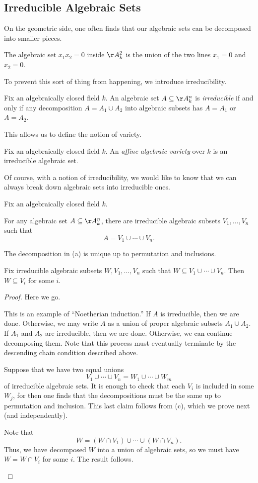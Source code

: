 \documentclass[../notes.tex]{subfiles}
\begin{document}
\subsection{Irreducible Algebraic Sets}
On the geometric side, one often finds that our algebraic sets can be decomposed into smaller pieces.
\begin{example}
	The algebraic set $x_1x_2=0$ inside $\AA^2_k$ is the union of the two lines $x_1=0$ and $x_2=0$.
\end{example}
To prevent this sort of thing from happening, we introduce irreducibility.
\begin{definition}[irreducible]
	Fix an algebraically closed field $k$. An algebraic set $A\subseteq\AA^n_k$ is \textit{irreducible} if and only if any decomposition $A=A_1\cup A_2$ into algebraic subsets has $A=A_1$ or $A=A_2$.
\end{definition}
This allows us to define the notion of variety.
\begin{definition}[variety]
	Fix an algebraically closed field $k$. An \textit{affine algebraic variety} over $k$ is an irreducible algebraic set.
\end{definition}
Of course, with a notion of irreducibility, we would like to know that we can always break down algebraic sets into irreducible ones.
\begin{proposition}
	Fix an algebraically closed field $k$.
	\begin{listalph}
		\item For any algebraic set $A\subseteq\AA^n_k$, there are irreducible algebraic subsets $V_1,\ldots,V_n$ such that
		\[A=V_1\cup\cdots\cup V_n.\]
		\item The decomposition in (a) is unique up to permutation and inclusions.
		\item Fix irreducible algebraic subsets $W,V_1,\ldots,V_n$ such that $W\subseteq V_1\cup\cdots\cup V_n$. Then $W\subseteq V_i$ for some $i$.
	\end{listalph}
\end{proposition}
\begin{proof}
	Here we go.
	\begin{listalph}
		\item This is an example of ``Noetherian induction.'' If $A$ is irreducible, then we are done. Otherwise, we may write $A$ as a union of proper algebraic subsets $A_1\cup A_2$. If $A_1$ and $A_2$ are irreducible, then we are done. Otherwise, we can continue decomposing them. Note that this process must eventually terminate by the descending chain condition described above.
		\item Suppose that we have two equal unions
		\[V_1\cup\cdots\cup V_n=W_1\cup\cdots\cup W_m\]
		of irreducible algebraic sets. It is enough to check that each $V_i$ is included in some $W_j$, for then one finds that the decompositions must be the same up to permutation and inclusion. This last claim follows from (c), which we prove next (and independently).
		\item Note that
		\[W=(W\cap V_1)\cup\cdots\cup(W\cap V_n).\]
		Thus, we have decomposed $W$ into a union of algebraic sets, so we must have $W=W\cap V_i$ for some $i$. The result follows.
		\qedhere
	\end{listalph}
\end{proof}
\end{document}
